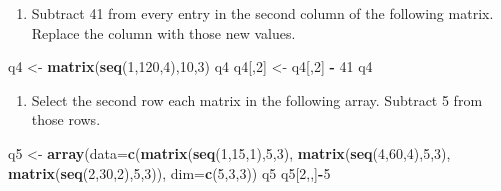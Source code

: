 \documentclass[
]{book}
\newenvironment{Shaded}{\begin{snugshade}}{\end{snugshade}}
\newcommand{\DataTypeTok}[1]{\textcolor[rgb]{0.13,0.29,0.53}{#1}}
\newcommand{\DecValTok}[1]{\textcolor[rgb]{0.00,0.00,0.81}{#1}}
\newcommand{\KeywordTok}[1]{\textcolor[rgb]{0.13,0.29,0.53}{\textbf{#1}}}
\newcommand{\NormalTok}[1]{#1}
\newcommand{\OperatorTok}[1]{\textcolor[rgb]{0.81,0.36,0.00}{\textbf{#1}}}
\newcommand{\StringTok}[1]{\textcolor[rgb]{0.31,0.60,0.02}{#1}}
\providecommand{\tightlist}{%
  \setlength{\itemsep}{0pt}\setlength{\parskip}{0pt}}
\begin{document}
\begin{center}
\begin{enumerate}
\def\labelenumi{\arabic{enumi}.}
\setcounter{enumi}{3}
\tightlist
\item
  Subtract 41 from every entry in the second column of the following matrix. Replace the column with those new values.
\end{enumerate}

\begin{Shaded}
\begin{Highlighting}[]
\NormalTok{  q4 <-}\StringTok{ }\KeywordTok{matrix}\NormalTok{(}\KeywordTok{seq}\NormalTok{(}\DecValTok{1}\NormalTok{,}\DecValTok{120}\NormalTok{,}\DecValTok{4}\NormalTok{),}\DecValTok{10}\NormalTok{,}\DecValTok{3}\NormalTok{)}
\NormalTok{  q4}
\NormalTok{  q4[,}\DecValTok{2}\NormalTok{] <-}\StringTok{ }\NormalTok{q4[,}\DecValTok{2}\NormalTok{] }\OperatorTok{-}\StringTok{ }\DecValTok{41}
\NormalTok{  q4}
\end{Highlighting}
\end{Shaded}

\begin{enumerate}
\def\labelenumi{\arabic{enumi}.}
\setcounter{enumi}{4}
\tightlist
\item
  Select the second row each matrix in the following array. Subtract 5 from those rows.
\end{enumerate}

\begin{Shaded}
\begin{Highlighting}[]
\NormalTok{  q5 <-}\StringTok{ }\KeywordTok{array}\NormalTok{(}\DataTypeTok{data=}\KeywordTok{c}\NormalTok{(}\KeywordTok{matrix}\NormalTok{(}\KeywordTok{seq}\NormalTok{(}\DecValTok{1}\NormalTok{,}\DecValTok{15}\NormalTok{,}\DecValTok{1}\NormalTok{),}\DecValTok{5}\NormalTok{,}\DecValTok{3}\NormalTok{),}
                  \KeywordTok{matrix}\NormalTok{(}\KeywordTok{seq}\NormalTok{(}\DecValTok{4}\NormalTok{,}\DecValTok{60}\NormalTok{,}\DecValTok{4}\NormalTok{),}\DecValTok{5}\NormalTok{,}\DecValTok{3}\NormalTok{),}
                  \KeywordTok{matrix}\NormalTok{(}\KeywordTok{seq}\NormalTok{(}\DecValTok{2}\NormalTok{,}\DecValTok{30}\NormalTok{,}\DecValTok{2}\NormalTok{),}\DecValTok{5}\NormalTok{,}\DecValTok{3}\NormalTok{)),}
                \DataTypeTok{dim=}\KeywordTok{c}\NormalTok{(}\DecValTok{5}\NormalTok{,}\DecValTok{3}\NormalTok{,}\DecValTok{3}\NormalTok{))}
\NormalTok{  q5}
\NormalTok{  q5[}\DecValTok{2}\NormalTok{,,]}\OperatorTok{-}\DecValTok{5}
\end{Highlighting}
\end{Shaded}


\end{center}
\end{document}
